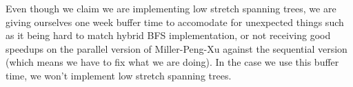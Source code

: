 \documentclass[11pt]{scrartcl}
\theoremstyle{plain}
\theoremstyle{definition}
\theoremstyle{remark}
\begin{document}
Even though we claim we are implementing low stretch spanning trees, we are giving ourselves one week buffer
time to accomodate for unexpected things such as it being hard to match hybrid BFS implementation,
or not receiving good speedups on the parallel version of Miller-Peng-Xu against the sequential
version (which means we have to fix what we are doing). In the case we use this buffer time,
we won't implement low stretch spanning trees. 



\end{document}

